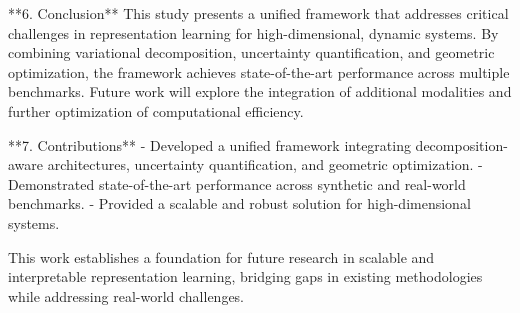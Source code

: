 **6. Conclusion**  
This study presents a unified framework that addresses critical challenges in representation learning for high-dimensional, dynamic systems. By combining variational decomposition, uncertainty quantification, and geometric optimization, the framework achieves state-of-the-art performance across multiple benchmarks. Future work will explore the integration of additional modalities and further optimization of computational efficiency.  

**7. Contributions**  
- Developed a unified framework integrating decomposition-aware architectures, uncertainty quantification, and geometric optimization.  
- Demonstrated state-of-the-art performance across synthetic and real-world benchmarks.  
- Provided a scalable and robust solution for high-dimensional systems.  

This work establishes a foundation for future research in scalable and interpretable representation learning, bridging gaps in existing methodologies while addressing real-world challenges.  